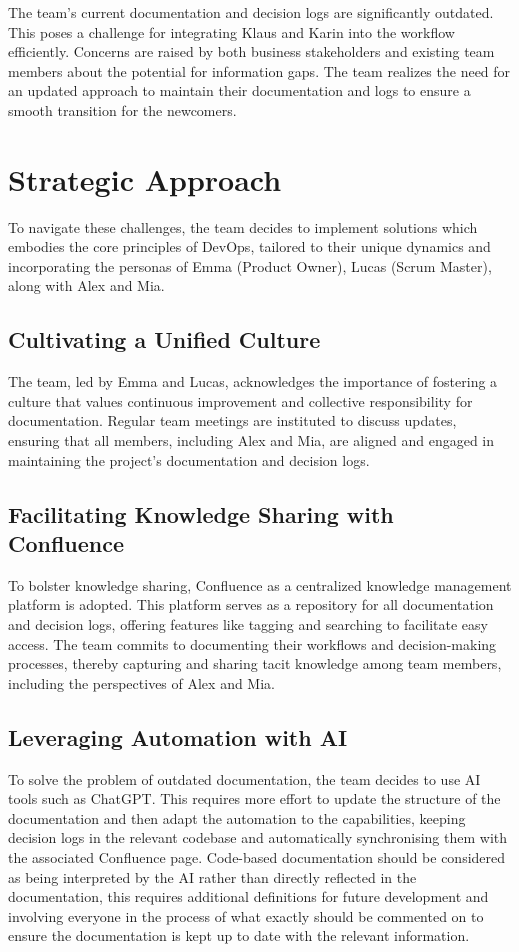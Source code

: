 The team's current documentation and decision logs are significantly outdated. This poses a challenge for integrating Klaus and Karin into the workflow efficiently. Concerns are raised by both business stakeholders and existing team members about the potential for information gaps. The team realizes the need for an updated approach to maintain their documentation and logs to ensure a smooth transition for the newcomers.

\section{Strategic Approach}
To navigate these challenges, the team decides to implement solutions which embodies the core principles of DevOps, tailored to their unique dynamics and incorporating the personas of Emma (Product Owner), Lucas (Scrum Master), along with Alex and Mia.

\subsection{Cultivating a Unified Culture}
The team, led by Emma and Lucas, acknowledges the importance of fostering a culture that values continuous improvement and collective responsibility for documentation. Regular team meetings are instituted to discuss updates, ensuring that all members, including Alex and Mia, are aligned and engaged in maintaining the project's documentation and decision logs.

\subsection{Facilitating Knowledge Sharing with Confluence}
To bolster knowledge sharing, Confluence as a centralized knowledge management platform is adopted. This platform serves as a repository for all documentation and decision logs, offering features like tagging and searching to facilitate easy access. The team commits to documenting their workflows and decision-making processes, thereby capturing and sharing tacit knowledge among team members, including the perspectives of Alex and Mia.

\subsection{Leveraging Automation with AI}
To solve the problem of outdated documentation, the team decides to use AI tools such as ChatGPT. This requires more effort to update the structure of the documentation and then adapt the automation to the capabilities, keeping decision logs in the relevant codebase and automatically synchronising them with the associated Confluence page. Code-based documentation should be considered as being interpreted by the AI rather than directly reflected in the documentation, this requires additional definitions for future development and involving everyone in the process of what exactly should be commented on to ensure the documentation is kept up to date with the relevant information.


